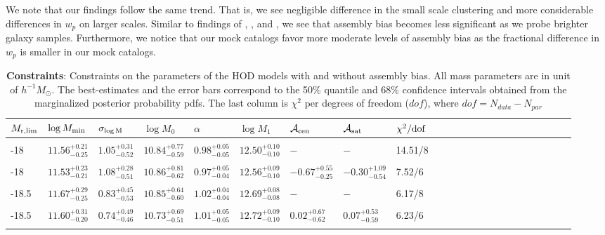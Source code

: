 \documentclass[12pt, preprint]{aastex}
\newcommand{\mzero}{\log M_{0}}
\newcommand{\mone}{\log M_{1}}
\newcommand{\mmin}{\log M_{\rm min}}
\newcommand{\sigmam}{\sigma_{\log \rm M}}
\newcommand{\acen}{\mathcal{A}_{\rm cen}}
\newcommand{\asat}{\mathcal{A}_{\rm sat}}
\begin{document}
We note that our findings follow the same trend. That is, we see negligible difference in the small scale clustering and more considerable differences in $w_{p}$ on larger scales. Similar to findings of \citet{arz2014}, \citet{lehman2015}, and \citet{edHOD-weinberg}, we see that assembly bias becomes less significant as we probe brighter galaxy samples. Furthermore, we notice that our mock catalogs favor more moderate levels of assembly bias as the fractional difference in $w_{p}$ is smaller in our mock catalogs. 

\begin{table}
\begin{center}
  \label{tab:constraints}
 \caption{{\bf Constraints}: Constraints on the parameters of the HOD models with and without assembly bias. 
All mass parameters are in unit of $h^{-1}M_\odot$. The best-estimates and the error bars correspond to the 50$\%$ quantile and 68$\%$ confidence intervals obtained from the marginalized posterior probability pdfs. The last column is $\chi^{2}$ per degrees of freedom ($dof$), where $dof = N_{data} - N_{par}$}
\begin{tabular}{@{}lllllllllllllllllllllll}
\hline 
   $M_{\rm r,lim}$ & $\mmin$ & $\sigmam$ & $\mzero$ & $\alpha$ &  $\mone$ & $\acen$ & $\asat$ & $\chi^{2}/\rm{dof}$ \\  \hline
  \\ 
 -18 & $11.56^{+0.21}_{-0.25}$ &  $1.05^{+0.31}_{-0.52}$ & $10.84^{+0.77}_{-0.59}$ & $0.98^{+0.05}_{-0.05}$ &  $12.50^{+0.10}_{-0.10}$ & $-$ & $-$ & 14.51/8\\\\
     
  -18 & $11.53^{+0.23}_{-0.21}$ &  $1.08^{+0.28}_{-0.51}$ & $10.86^{+0.81}_{-0.62}$ & $0.97^{+0.05}_{-0.04}$ &  $12.56^{+0.09}_{-0.10}$ & $-0.67^{+0.55}_{-0.25}$ & $-0.30^{+1.09}_{-0.54}$ & 7.52/6\\ \\
     
-18.5 & $11.67^{+0.29}_{-0.25}$ &  $0.83^{+0.45}_{-0.53}$ & $10.85^{+0.64}_{-0.60}$ & $1.02^{+0.04}_{-0.04}$ &  $12.69^{+0.08}_{-0.08}$ & $-$ & $-$ & 6.17/8\\ \\
    
-18.5 & $11.60^{+0.31}_{-0.20}$ &  $0.74^{+0.49}_{-0.46}$ & $10.73^{+0.69}_{-0.51}$ & $1.01^{+0.05}_{-0.05}$ &  $12.72^{+0.09}_{-0.10}$ & $0.02^{+0.67}_{-0.62}$ & $0.07^{+0.53}_{-0.59}$ & 6.23/6\\ \\


\end{tabular}
\end{center}
\end{table}
\end{document}

